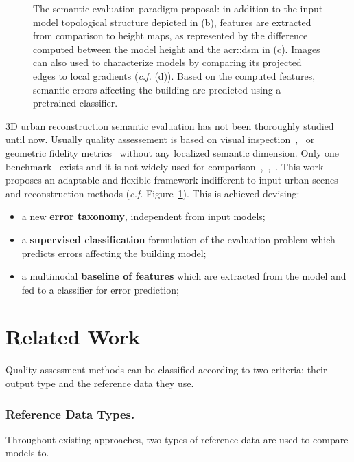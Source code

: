 \documentclass[runningheads]{llncs}
\begin{document}
	\begin{figure}
        \begin{center}
            
            \caption{\label{fig::pipeline} The semantic evaluation paradigm proposal: in addition to the input model topological structure depicted in (b), features are extracted from comparison to height maps, as represented by the difference computed between the model height and the \acrlong{acr::dsm} in (c). Images can also used to characterize models by comparing its projected edges to local gradients (\textit{c.f.} (d)). Based on the computed features, semantic errors affecting the building are predicted using a pretrained classifier.}
        \end{center}
    \end{figure}
     3D urban reconstruction semantic evaluation has not been thoroughly studied until now. Usually quality assessement is based on visual inspection~\cite{Durupt2006},~\cite{MacayMoreia2013} or geometric fidelity metrics~\cite{Kaartinen2005} without any localized semantic dimension. Only one benchmark~\cite{rottensteiner2014results} exists and it is not widely used for comparison~\cite{li2016boxfitting},~\cite{nan2017polyfit},~\cite{nguatem2017modeling}. This work proposes an adaptable and flexible framework indifferent to input urban scenes and reconstruction methods (\textit{c.f.} Figure~\ref{fig::pipeline}). This is achieved devising:
    \begin{itemize}
        \item a new \textbf{error taxonomy}, independent from input models;
        \item a \textbf{supervised classification} formulation of the evaluation problem which predicts errors affecting the building model;
        \item a multimodal \textbf{baseline of features} which are extracted from the model and fed to a classifier for error prediction;
    \end{itemize}

\section{Related Work}

Quality assessment methods can be classified according to two criteria: their output type and the reference data they use.

\subsubsection{Reference Data Types.}
Throughout existing approaches, two types of reference data are used to compare models to.
\end{document}
